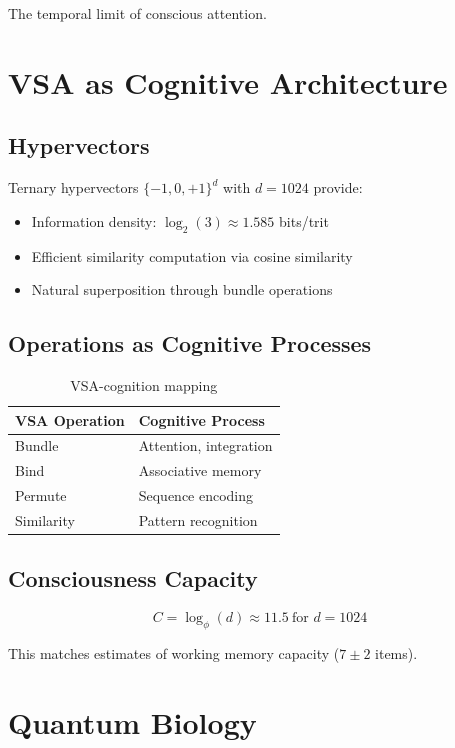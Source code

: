 \documentclass[12pt,a4paper]{article}
\begin{document}
The temporal limit of conscious attention.

\section{VSA as Cognitive Architecture}

\subsection{Hypervectors}

Ternary hypervectors $\{-1, 0, +1\}^d$ with $d = 1024$ provide:
\begin{itemize}
\item Information density: $\log_2(3) \approx 1.585$ bits/trit
\item Efficient similarity computation via cosine similarity
\item Natural superposition through bundle operations
\end{itemize}

\subsection{Operations as Cognitive Processes}

\begin{table}[h]
\centering
\begin{tabular}{ll}
\toprule
VSA Operation & Cognitive Process \\
\midrule
Bundle & Attention, integration \\
Bind & Associative memory \\
Permute & Sequence encoding \\
Similarity & Pattern recognition \\
\bottomrule
\end{tabular}
\caption{VSA-cognition mapping}
\end{table}

\subsection{Consciousness Capacity}

\begin{equation}
C = \log_\phi(d) \approx 11.5~\text{for } d = 1024
\end{equation}

This matches estimates of working memory capacity ($7 \pm 2$ items).

\section{Quantum Biology}
\end{document}
